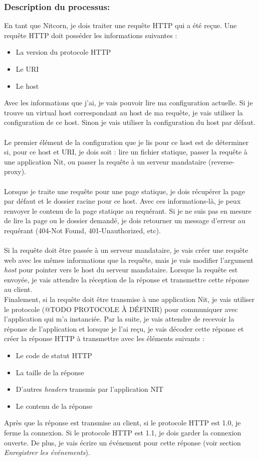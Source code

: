\documentclass{scrreprt}
\begin{document}
\subsubsection{Description du processus:}En tant que Nitcorn, je dois traiter une requête HTTP qui a été reçue. Une requête HTTP doit posséder les informations suivantes :
\begin{itemize}
    \item La version du protocole HTTP
    \item Le URI
    \item Le host
\end{itemize}
Avec les informations que j'ai, je vais pouvoir lire ma configuration actuelle. Si
je trouve un virtual host correspondant au host de ma requête, je vais utiliser la configuration de ce host. Sinon je vais utiliser la configuration du host par défaut. \\
\\
Le premier élément de la configuration que je lis pour ce host est de déterminer
si, pour ce host et URI, je dois soit : lire un fichier statique, passer la requête
à une application Nit, ou passer la requête à un serveur mandataire (reverse-proxy).\\
\\
Lorsque je traite une requête pour une page statique, je dois récupérer la page par
défaut et le dossier racine pour ce host. Avec ces informations-là, je peux renvoyer
le contenu de la page statique au requérant. Si je ne suis pas en mesure de lire
la page ou le dossier demandé, je dois retourner un message d'erreur au requérant
(404-Not Found, 401-Unauthorized, etc).\\
\\
Si la requête doit être passée à un serveur mandataire, je vais créer
une requête web avec les mêmes informations que la requête, mais je vais modifier
l'argument \textit{host} pour pointer vers le host du serveur mandataire. Lorsque
la requête est envoyée, je vais attendre la réception de la réponse et transmettre
cette réponse au client.
\\
Finalement, si la requête doit être transmise à une application Nit, je vais utiliser
le protocole (@TODO PROTOCOLE À DÉFINIR) pour communiquer avec l'application
qui m'a instanciée. Par la suite, je vais attendre de recevoir la réponse de l'application
et lorsque je l'ai reçu, je vais décoder cette réponse et créer la réponse HTTP
à transmettre avec les éléments suivants :
\begin{itemize}
    \item Le code de statut HTTP
    \item La taille de la réponse
    \item D'autres \textit{headers} transmis par l'application NIT
    \item Le contenu de la réponse
\end{itemize}
Après que la réponse est transmise au client, si le protocole HTTP est 1.0, je ferme
la connexion. Si le protocole HTTP est 1.1, je dois garder la connexion
ouverte. De plus, je vais écrire un événement pour cette réponse (voir section
\textit{Enregistrer les événements}).
\end{document}
